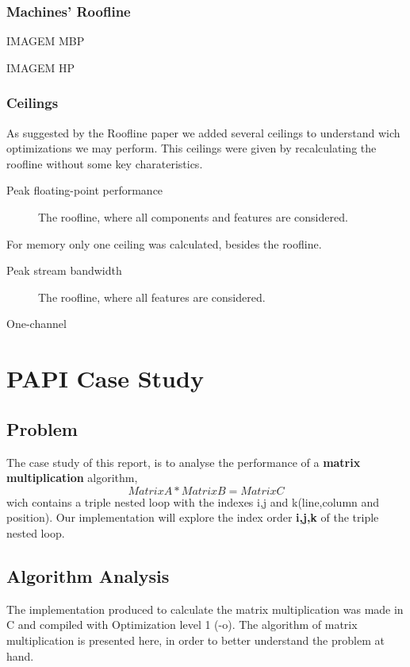\documentclass[a4paper,10pt,openright,openbib]{article}
\begin{document}
\subsubsection{Machines' Roofline}
IMAGEM MBP

IMAGEM HP

\subsubsection{Ceilings}
As suggested by the Roofline paper we added several ceilings to understand wich optimizations we may perform.
This ceilings were given by recalculating the roofline without some key charateristics.
\begin{description}
\item[Peak floating-point performance] The roofline, where all components and features are considered.
\item[]
\item[]
\item[]
\end{description}
For memory only one ceiling was calculated, besides the roofline.
\begin{description}
\item[Peak stream bandwidth] The roofline, where all features are considered.
\item[One-channel]
\end{description}

\section{PAPI Case Study}
\subsection{Problem}
The case study of this report, is to analyse the performance of a \textbf{matrix multiplication} algorithm, \begin{equation}Matrix A * Matrix B = Matrix C\end{equation} wich contains a triple nested loop with the indexes i,j and k(line,column and position). Our implementation will explore the index order \textbf{i,j,k} of the triple nested loop.

\subsection{Algorithm Analysis}
The implementation produced to calculate the matrix multiplication was made in C and compiled with Optimization level 1 (-o).
The algorithm of matrix multiplication is presented here, in order to better understand the problem at hand.
\end{document}
